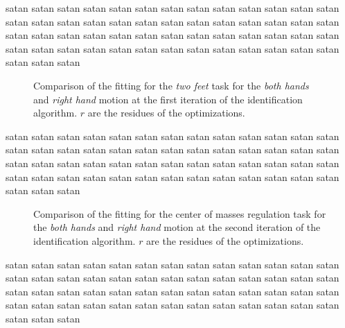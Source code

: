 \documentclass[letterpaper, 10pt, conference]{ieeeconf}      %
\begin{document}
satan satan satan satan satan satan satan satan satan satan satan
satan satan satan satan satan satan satan satan satan satan satan
satan satan satan satan satan satan satan satan satan satan satan
satan satan satan satan satan satan satan satan satan satan satan
satan satan satan satan satan satan satan satan satan satan satan

\begin{figure}[t]
  \centering
  \caption{Comparison of the fitting for the \emph{two feet} task for the
  \emph{both hands} and \emph{right hand} motion at the first
  iteration of the identification algorithm.  $r$ are the
  residues of the optimizations.}
  \label{fig:exp1:taskTwofeet0}
\end{figure}

satan satan satan satan satan satan satan satan satan satan satan
satan satan satan satan satan satan satan satan satan satan satan
satan satan satan satan satan satan satan satan satan satan satan
satan satan satan satan satan satan satan satan satan satan satan
satan satan satan satan satan satan satan satan satan satan satan

\begin{figure}[t]
  \centering
\caption{Comparison of the fitting for the center of masses regulation task for the \emph{both hands} and \emph{right hand} motion at the second iteration of the identification algorithm.
$r$ are the residues of the optimizations.}
\label{fig:exp1:taskCom1}
\end{figure}

satan satan satan satan satan satan satan satan satan satan satan
satan satan satan satan satan satan satan satan satan satan satan
satan satan satan satan satan satan satan satan satan satan satan
satan satan satan satan satan satan satan satan satan satan satan
satan satan satan satan satan satan satan satan satan satan satan
\end{document}
